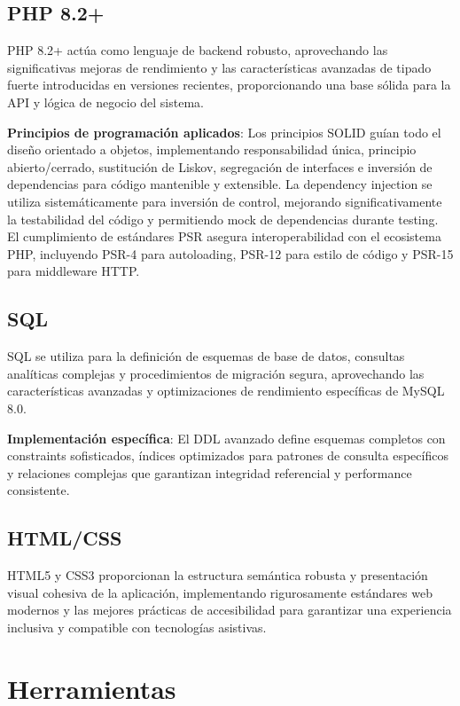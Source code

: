 \documentclass[12pt,a4paper,oneside]{report}
\begin{document}
\subsection{PHP 8.2+}\label{php-8.2}

PHP 8.2+ actúa como lenguaje de backend robusto, aprovechando las significativas mejoras de rendimiento y las características avanzadas de tipado fuerte introducidas en versiones recientes, proporcionando una base sólida para la API y lógica de negocio del sistema.

\textbf{Principios de programación aplicados}: Los principios SOLID guían todo el diseño orientado a objetos, implementando responsabilidad única, principio abierto/cerrado, sustitución de Liskov, segregación de interfaces e inversión de dependencias para código mantenible y extensible. La dependency injection se utiliza sistemáticamente para inversión de control, mejorando significativamente la testabilidad del código y permitiendo mock de dependencias durante testing. El cumplimiento de estándares PSR asegura interoperabilidad con el ecosistema PHP, incluyendo PSR-4 para autoloading, PSR-12 para estilo de código y PSR-15 para middleware HTTP.

\subsection{SQL}\label{sql}

SQL se utiliza para la definición de esquemas de base de datos, consultas analíticas complejas y procedimientos de migración segura, aprovechando las características avanzadas y optimizaciones de rendimiento específicas de MySQL 8.0.

\textbf{Implementación específica}: El DDL avanzado define esquemas completos con constraints sofisticados, índices optimizados para patrones de consulta específicos y relaciones complejas que garantizan integridad referencial y performance consistente.

\subsection{HTML/CSS}\label{htmlcss}

HTML5 y CSS3 proporcionan la estructura semántica robusta y presentación visual cohesiva de la aplicación, implementando rigurosamente estándares web modernos y las mejores prácticas de accesibilidad para garantizar una experiencia inclusiva y compatible con tecnologías asistivas.

\section{Herramientas}\label{herramientas}
\end{document}
